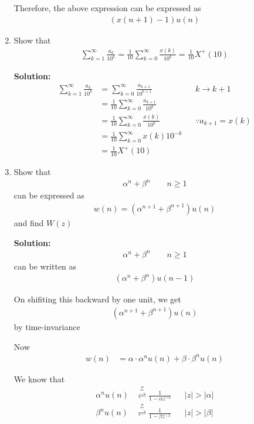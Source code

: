 \documentclass[journal,12pt,twocolumn]{IEEEtran}
\newcommand{\solution}{\noindent \textbf{Solution: }}
\providecommand{\brak}[1]{\ensuremath{\left(#1\right)}}
\providecommand{\abs}[1]{\left\vert#1\right\vert}
\providecommand{\ztrans}{\overset{\mathcal{Z}}{ \rightleftharpoons}}
\numberwithin{equation}{section}
\renewcommand\thesection{\arabic{section}}
\begin{document}
\begin{enumerate}[label=\thesection.\arabic*,ref=\thesection.\theenumi]
Therefore, the above expression can be expressed as
\begin{align}
	(x(n+1) - 1)u(n)
\end{align}

\item Show that 
\begin{align}
	\sum_{k=1}^{\infty}\frac{a_k}{10^k}= 
	\frac{1}{10}\sum_{k=0}^{\infty}\frac{x\brak{k}}{10^k} =\frac{1}{10}X^{+}\brak{{10}}
\end{align}

\solution 
\begin{align}
    \sum_{k=1}^{\infty}\frac{a_k}{10^k} 
    &= \sum_{k = 0}^{\infty}\frac{a_{k+1}}{10^{k+1}} && k \rightarrow k + 1 \\
    &= \frac{1}{10}\sum_{k = 0}^{\infty}\frac{a_{k+1}}{10^k} \\
    &= \frac{1}{10}\sum_{k = 0}^{\infty}\frac{x(k)}{10^k} &&\because a_{k+1} = x(k) \\
    &= \frac{1}{10}\sum_{k = 0}^{\infty} x(k) 10^{-k} \\
    &= \frac{1}{10}X^+(10) 
\end{align}

\item Show that 
\begin{align}
	\alpha^n + \beta^n \qquad n \ge 1
\end{align}
can be expressed as 
\begin{align}
	w(n) = \brak{\alpha^{n+1} + \beta^{n+1}}u(n)
\end{align}
and find $W(z)$

\solution 
\begin{align}
	\alpha^n + \beta^n \qquad n \ge 1
\end{align}
can be written as
\begin{align}
	(\alpha^n + \beta^n) u(n-1)
\end{align}

On shifiting this backward by one unit, we get
\begin{align}
	(\alpha^{n+1} + \beta^{n+1}) u(n)
\end{align}
by time-invariance

Now
\begin{align}
	w(n) &= \alpha \cdot \alpha^n u(n) + \beta \cdot \beta^n u(n) 
\end{align}

We know that
\begin{align}
	\alpha^n u(n) &\ztrans \frac{1}{1-\alpha z^{-1}} &&\abs{z} > \abs{\alpha} \\
	\beta^n u(n) &\ztrans \frac{1}{1-\beta z^{-1}} &&\abs{z} > \abs{\beta}
\end{align}


\end{enumerate}
\end{document}
